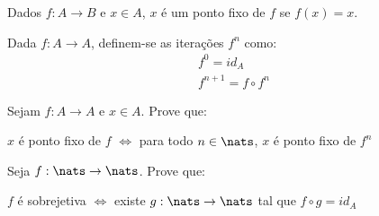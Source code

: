 \begin{definition}
Dados $f: A \to B$ e $x \in A$, $x$ é um ponto fixo de $f$ se $f(x)=x$.
\end{definition}

\begin{definition}
Dada $f: A \to A$, definem-se as iterações $f^n$ como:
%
\begin{gather*}
f^0 = id_A\\
f^{n+1} = f \circ f^n
\end{gather*}

\end{definition}

\begin{exercise}
Sejam $f: A \to A$ e $x \in A$. Prove que:

\begin{center}
        $x$ é ponto fixo de $f$ $\iff$ para todo $n \in \nats$, $x$ é ponto fixo de $f^n$
    \end{center}
\end{exercise}

\begin{exercise}   
    Seja $f: \nats \to \nats$. Prove que:

    \begin{center}
        $f$ é sobrejetiva $\iff$ existe $g: \nats \to \nats$ tal que $f \circ g = id_A$
    \end{center}
\end{exercise}